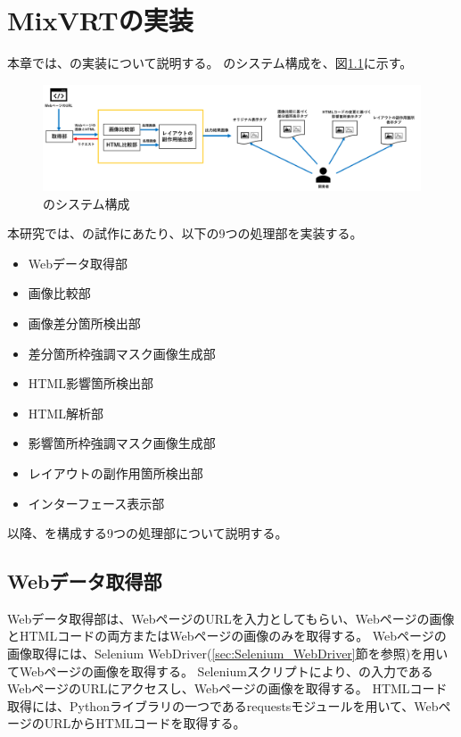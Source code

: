 \chapter{MixVRTの実装}\label{cha:Implementation}
本章では、\toolName の実装について説明する。
\toolName のシステム構成を、図\ref{fig:System}に示す。
\begin{figure}[tp]
    \begin{center}
        \includegraphics[width=1.0\columnwidth]{image/4_System.png}
        \caption{\toolName のシステム構成}
        \label{fig:System}
    \end{center}
\end{figure}
本研究では、\toolName の試作にあたり、以下の9つの処理部を実装する。
\begin{itemize}
    \item Webデータ取得部
    \item 画像比較部
    \item 画像差分箇所検出部
    \item 差分箇所枠強調マスク画像生成部
    \item HTML影響箇所検出部
    \item HTML解析部
    \item 影響箇所枠強調マスク画像生成部
    \item レイアウトの副作用箇所検出部
    \item インターフェース表示部
\end{itemize}
以降、\toolName を構成する9つの処理部について説明する。
\par



\section{Webデータ取得部}\label{sec:Web_data_get_section}
Webデータ取得部は、WebページのURLを入力としてもらい、Webページの画像とHTMLコードの両方またはWebページの画像のみを取得する。
Webページの画像取得には、Selenium WebDriver(\ref{sec:Selenium_WebDriver}節を参照)を用いてWebページの画像を取得する。
Seleniumスクリプトにより、\toolName の入力であるWebページのURLにアクセスし、Webページの画像を取得する。
HTMLコード取得には、Pythonライブラリの一つであるrequestsモジュールを用いて、WebページのURLからHTMLコードを取得する。


